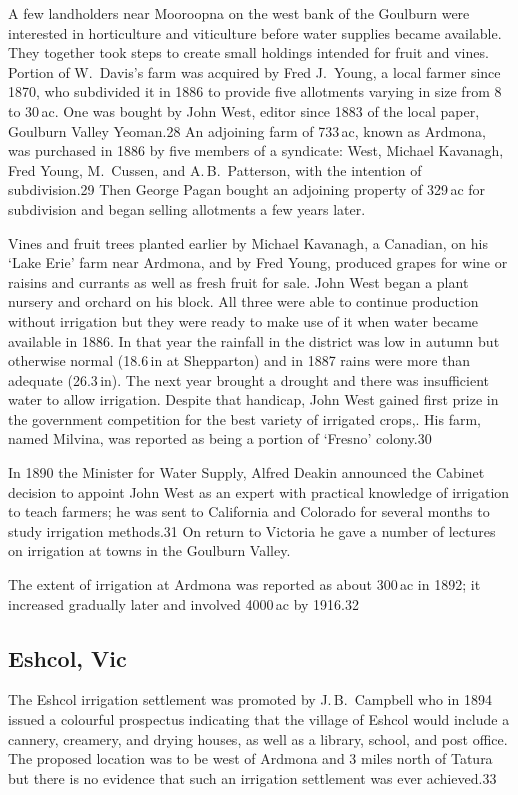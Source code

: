 A few landholders near Mooroopna on the west bank of the Goulburn were
interested in horticulture and viticulture before water supplies
became available.  They together took steps to create small holdings
intended for fruit and vines.  Portion of W.~Davis's farm was acquired
by Fred J.~Young, a local farmer since 1870, who subdivided it in 1886
to provide five allotments varying in size from 8 to 30\,ac. One was
bought by John West, editor since 1883 of the local paper, Goulburn
Valley Yeoman.28 An adjoining farm of 733\,ac, known as Ardmona, was
purchased in 1886 by five members of a syndicate: West, Michael
Kavanagh, Fred Young, M.~Cussen, and A.\,B.~Patterson, with the
intention of subdivision.29 Then George Pagan bought an adjoining
property of 329\,ac for subdivision and began selling allotments a few
years later.

Vines and fruit trees planted earlier by Michael Kavanagh, a Canadian,
on his `Lake Erie' farm near Ardmona, and by Fred Young, produced
grapes for wine or raisins and currants as well as fresh fruit for
sale.  John West began a plant nursery and orchard on his block.  All
three were able to continue production without irrigation but they
were ready to make use of it when water became available in 1886.  In
that year the rainfall in the district was low in autumn but otherwise
normal (18.6\,in at Shepparton) and in 1887 rains were more than
adequate (26.3\,in).  The next year brought a drought and there was
insufficient water to allow irrigation.  Despite that handicap, John
West gained first prize in the government competition for the best
variety of irrigated crops,. His farm, named Milvina, was reported as
being a portion of `Fresno' colony.30

In 1890 the Minister for Water Supply, Alfred Deakin announced the
Cabinet decision to appoint John West as an expert with practical
knowledge of irrigation to teach farmers; he was sent to California
and Colorado for several months to study irrigation methods.31 On
return to Victoria he gave a number of lectures on irrigation at towns
in the Goulburn Valley.

The extent of irrigation at Ardmona was reported as about 300\,ac in
1892; it increased gradually later and involved 4000\,ac by 1916.32

\subsection{Eshcol, Vic}

The Eshcol irrigation settlement was promoted by J.\,B.~Campbell who
in 1894 issued a colourful prospectus indicating that the village of
Eshcol would include a cannery, creamery, and drying houses, as well
as a library, school, and post office.  The proposed location was to
be west of Ardmona and 3 miles north of Tatura but there is no
evidence that such an irrigation settlement was ever achieved.33

